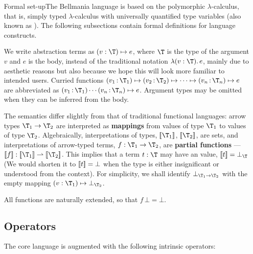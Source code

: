 \bigskip
\begin{paragraph}{Formal set-up}The Bellmania language is based on the polymorphic
$\lambda$-calculus, that is, simply typed $\lambda$-calculus with universally quantified type variables 
(also known as ).
The following subsections contain formal definitions for language constructs.
\end{paragraph}

We write abstraction terms as $(v:\T)\mapsto e$, where $\T$ is the type of the argument $v$ and $e$ is
the body, instead of the traditional notation $\lambda(v:\T).\,e$, mainly due to aesthetic reasons
but also because we hope this will look more familiar to intended users.
Curried functions $(v_1\,{:}\,\T_1)\mapsto (v_2\,{:}\,\T_2) \mapsto \cdots \mapsto (v_n\,{:}\,\T_n) \mapsto e$ are abbreviated 
as $(v_1\,{:}\,\T_1)\cdots(v_n\,{:}\,\T_n)\mapsto e$. Argument types may be omitted when
they can be inferred from the body.

The semantics differ slightly from that of traditional functional languages: arrow types $\T_1\to\T_2$
are interpreted as {\bf mappings} from values of type $\T_1$ to values of type $\T_2$. Algebraically,
interpretations of types, $\semp{\T_1}$, $\semp{\T_2}$, are sets, and interpretations of arrow-typed terms,
$f : \T_1\to\T_2$, are {\bf partial functions} --- $\semp{f} : \semp{\T_1}\rightharpoonup\semp{\T_2}$.
This implies that a term $t : \T$ may have an  value, $\semp{t}=\bot_\T$
(We would shorten it to $[\![{t}]\!]=\bot$ when the type is either insignificant or understood from the context).
For simplicity, we shall identify $\bot_{\T_1\to\T_2}$ with the empty mapping $(v:\T_1)\mapsto\bot_{\T_2}$.

All functions are naturally extended, so that $f\,\bot=\bot$.

\subsection{Operators}
\label{lang:operators}

The core language is augmented with the following intrinsic operators:

